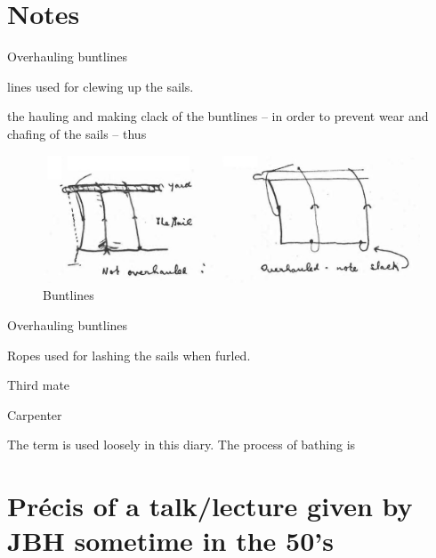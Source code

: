 \documentclass[
  11pt,
  msmallroyalvopaper
]{memoir}
\providecommand{\tightlist}{%
  \setlength{\itemsep}{0pt}\setlength{\parskip}{0pt}}
\begin{document}
\hypertarget{notes}{%
\chapter{Notes}\label{notes}}


\begin{labeling}{Overhauling buntlines}
\tightlist
\item[Buntlines]
lines used for clewing up the sails.
\item[Overhauling buntlines]
the hauling and making clack of the buntlines -- in order to prevent
wear and chafing of the sails -- thus
\end{labeling}

\begin{figure}
\centering
\includegraphics{./images/overhauled.jpg}
\caption{Buntlines}
\end{figure}

\begin{labeling}{Overhauling buntlines}
\tightlist
\item[Gaskets]
Ropes used for lashing the sails when furled.
\item[Tria]
Third mate
\item[Timpa]
Carpenter
\item[Bath]
The term is used loosely in this diary. The process of bathing is
\end{labeling}

\hypertarget{pruxe9cis-of-a-talklecture-given-by-jbh-sometime-in-the-50s}{%
\chapter{Précis of a talk/lecture given by JBH sometime in the
50's}\label{pruxe9cis-of-a-talklecture-given-by-jbh-sometime-in-the-50s}}
\end{document}
